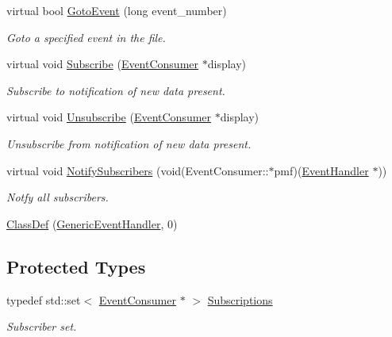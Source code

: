 \begin{DoxyCompactItemize}
virtual bool \hyperlink{class_d_d4hep_1_1_generic_event_handler_a7a7c4d1592e5b2d467a426058aa1a44b}{GotoEvent} (long event\_\-number)
\begin{DoxyCompactList}\small\item\em Goto a specified event in the file. \item\end{DoxyCompactList}\item 
virtual void \hyperlink{class_d_d4hep_1_1_generic_event_handler_a8065b0b0f095783b7daf38ff19660cf7}{Subscribe} (\hyperlink{class_d_d4hep_1_1_event_consumer}{EventConsumer} $\ast$display)
\begin{DoxyCompactList}\small\item\em Subscribe to notification of new data present. \item\end{DoxyCompactList}\item 
virtual void \hyperlink{class_d_d4hep_1_1_generic_event_handler_a030cffac2446e410dba9dec87802e035}{Unsubscribe} (\hyperlink{class_d_d4hep_1_1_event_consumer}{EventConsumer} $\ast$display)
\begin{DoxyCompactList}\small\item\em Unsubscribe from notification of new data present. \item\end{DoxyCompactList}\item 
virtual void \hyperlink{class_d_d4hep_1_1_generic_event_handler_a01e7a0bdb965b93d5a3b0ba8f9ccb85e}{NotifySubscribers} (void(EventConsumer::$\ast$pmf)(\hyperlink{class_d_d4hep_1_1_event_handler}{EventHandler} $\ast$))
\begin{DoxyCompactList}\small\item\em Notfy all subscribers. \item\end{DoxyCompactList}\item 
\hyperlink{class_d_d4hep_1_1_generic_event_handler_abbb82b5fc62720e45ed6c2ff03ae526d}{ClassDef} (\hyperlink{class_d_d4hep_1_1_generic_event_handler}{GenericEventHandler}, 0)
\end{DoxyCompactItemize}
\subsection*{Protected Types}
\begin{DoxyCompactItemize}
\item 
typedef std::set$<$ \hyperlink{class_d_d4hep_1_1_event_consumer}{EventConsumer} $\ast$ $>$ \hyperlink{class_d_d4hep_1_1_generic_event_handler_a4b7fd1ba9fc0adab2fa1885162e69076}{Subscriptions}
\begin{DoxyCompactList}\small\item\em Subscriber set. \item\end{DoxyCompactList}\end{DoxyCompactItemize}
